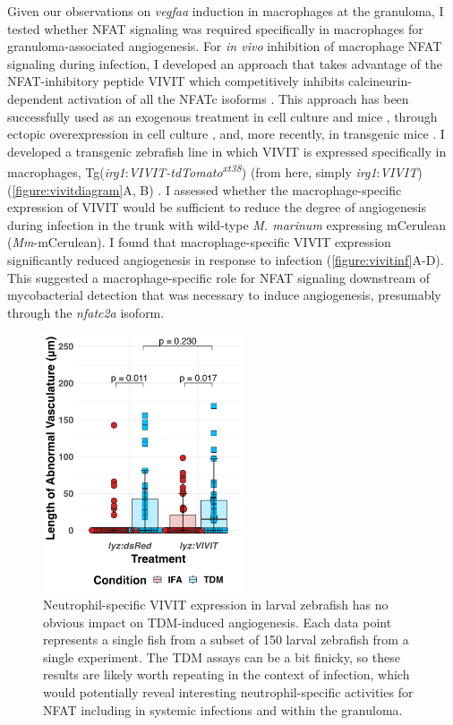 Given our observations on \textit{vegfaa} induction in macrophages at the granuloma, I tested whether NFAT signaling was required specifically in macrophages for granuloma\hyp{}associated angiogenesis. For \textit{in vivo} inhibition of macrophage NFAT signaling during infection, I developed an approach that takes advantage of the NFAT\hyp{}inhibitory peptide VIVIT which competitively inhibits calcineurin\hyp{}dependent activation of all the NFATc isoforms \citep{Aramburu1999}. This approach has been successfully used as an exogenous treatment in cell culture \citep{Deerhake2021} and mice \citep{Noguchi2004, Elloumi2012, Rojanathammanee2015}, through ectopic overexpression in cell culture \citep{McCullagh2004}, and, more recently, in transgenic mice \citep{Poli2022, Peuker2022}. I developed a transgenic zebrafish line in which VIVIT is expressed specifically in macrophages, Tg(\textit{irg1}:\textit{VIVIT\hyp{}tdTomato\textsuperscript{xt38}}) (from here, simply \textit{irg1}:\textit{VIVIT}) (\autoref{figure:vivitdiagram}A, B) \citep{Sanderson2015}. I assessed whether the macrophage\hyp{}specific expression of VIVIT would be sufficient to reduce the degree of angiogenesis during infection in the trunk with wild\hyp{}type \textit{M. marinum} expressing mCerulean (\textit{Mm}\hyp{}mCerulean). I found that macrophage\hyp{}specific VIVIT expression significantly reduced angiogenesis in response to infection (\autoref{figure:vivitinf}A\hyp{}D). This suggested a macrophage\hyp{}specific role for NFAT signaling downstream of mycobacterial detection that was necessary to induce angiogenesis, presumably through the \textit{nfatc2a} isoform.

\begin{figure}
\centering
\includegraphics[height=3in]{images/JB210_lyzVIVIT_TDM_110522.png}
\caption[\textit{lyz}:\textit{VIVIT\hyp{}tdTomato} does not impact angiogenesis]{Neutrophil\hyp{}specific VIVIT expression in larval zebrafish has no obvious impact on TDM\hyp{}induced angiogenesis. Each data point represents a single fish from a subset of 150 larval zebrafish from a single experiment. The TDM assays can be a bit finicky, so these results are likely worth repeating in the context of infection, which would potentially reveal interesting neutrophil\hyp{}specific activities for NFAT including in systemic infections and within the granuloma.}
\label{figure:lyzvivit}
\end{figure}

